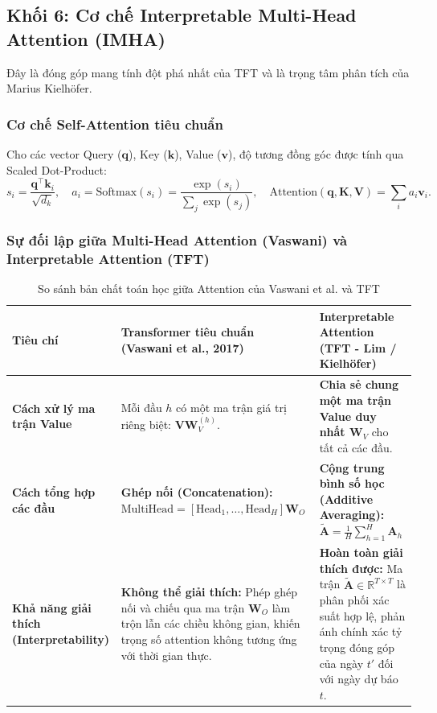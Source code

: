 \documentclass[12pt,a4paper,oneside]{article}
\begin{document}
\subsection{Khối 6: Cơ chế Interpretable Multi-Head Attention (IMHA)}
\label{subsec:interpretable_mha}

Đây là đóng góp mang tính đột phá nhất của TFT và là trọng tâm phân tích của Marius Kielh\"{o}fer.

\subsubsection{Cơ chế Self-Attention tiêu chuẩn}
Cho các vector Query ($\mathbf{q}$), Key ($\mathbf{k}$), Value ($\mathbf{v}$), độ tương đồng góc được tính qua Scaled Dot-Product:
\begin{equation}
    s_i = \frac{\mathbf{q}^\top \mathbf{k}_i}{\sqrt{d_k}}, \quad a_i = \text{Softmax}(s_i) = \frac{\exp(s_i)}{\sum_j \exp(s_j)}, \quad \text{Attention}(\mathbf{q}, \mathbf{K}, \mathbf{V}) = \sum_i a_i \mathbf{v}_i.
    \label{eq:scaled_dot}
\end{equation}

\subsubsection{Sự đối lập giữa Multi-Head Attention (Vaswani) và Interpretable Attention (TFT)}

\begin{table}[htbp]
\centering
\small
\caption{So sánh bản chất toán học giữa Attention của Vaswani et al. và TFT}
\label{tab:attention_comparison}
\begin{tabularx}{\textwidth}{p{3.2cm} X X}
\toprule
\textbf{Tiêu chí} & \textbf{Transformer tiêu chuẩn (Vaswani et al., 2017)} & \textbf{Interpretable Attention (TFT - Lim / Kielh\"{o}fer)} \\
\midrule
\textbf{Cách xử lý ma trận Value} & Mỗi đầu $h$ có một ma trận giá trị riêng biệt: $\mathbf{V}\mathbf{W}_V^{(h)}$. & \textbf{Chia sẻ chung một ma trận Value duy nhất $\mathbf{W}_V$} cho tất cả các đầu. \\
\addlinespace
\textbf{Cách tổng hợp các đầu} & \textbf{Ghép nối (Concatenation):}\newline
$\text{MultiHead} = [\text{Head}_1, \dots, \text{Head}_H] \mathbf{W}_O$ & \textbf{Cộng trung bình số học (Additive Averaging):}\newline
$\tilde{\mathbf{A}} = \frac{1}{H}\sum_{h=1}^H \mathbf{A}_h$ \\
\addlinespace
\textbf{Khả năng giải thích (Interpretability)} & \textbf{Không thể giải thích:} Phép ghép nối và chiếu qua ma trận $\mathbf{W}_O$ làm trộn lẫn các chiều không gian, khiến trọng số attention không tương ứng với thời gian thực. & \textbf{Hoàn toàn giải thích được:} Ma trận $\tilde{\mathbf{A}} \in \mathbb{R}^{T \times T}$ là phân phối xác suất hợp lệ, phản ánh chính xác tỷ trọng đóng góp của ngày $t'$ đối với ngày dự báo $t$. \\
\bottomrule
\end{tabularx}
\end{table}
\end{document}
